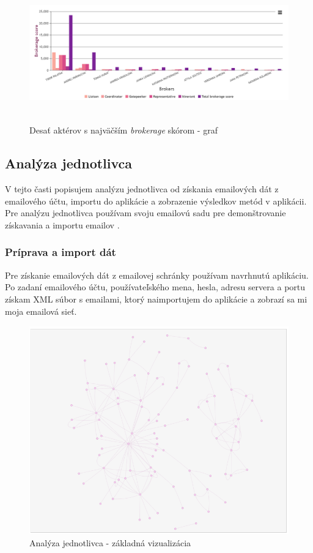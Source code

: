 \documentclass[slovak,master,public,dept460,male,cpdeclaration,oneside]{diploma}
\begin{document}
\begin{figure}[H]
\centering
\includegraphics[width=15cm, height=6cm]{figures/team_brokerage_graph}
\caption{Desať aktérov s najväčším \textit{brokerage} skórom - graf}
\label{team_brokerage_graph}
\end{figure}

\subsection{Analýza jednotlivca}
V tejto časti popisujem analýzu jednotlivca od získania emailových dát z emailového účtu, importu do aplikácie a zobrazenie výsledkov metód v aplikácii. Pre analýzu jednotlivca používam svoju emailovú sadu pre demonštrovanie získavania a importu emailov .

\subsubsection{Príprava a import dát}
Pre získanie emailových dát z emailovej schránky používam navrhnutú aplikáciu. Po zadaní emailového účtu, používateľského mena, hesla, adresu servera a portu získam XML súbor s emailami, ktorý naimportujem do aplikácie a zobrazí sa mi moja emailová sieť.


\begin{figure}[H]
\centering
\includegraphics[width=13cm, height=9cm]{figures/analyza_jednotlivca_net}
\caption{Analýza jednotlivca - základná vizualizácia}
\label{team_brokerage_graph}
\end{figure}
\end{document}
